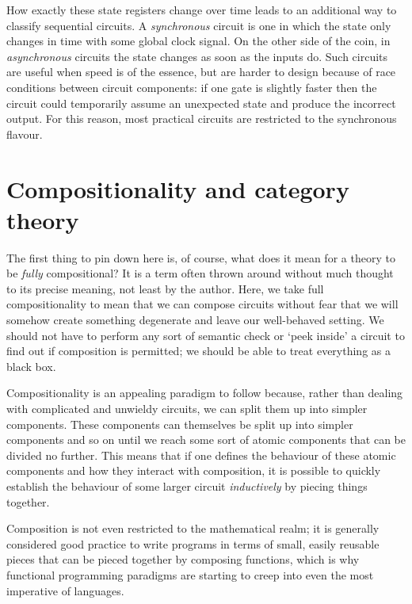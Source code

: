 How exactly these state registers change over time leads to an additional way
to classify sequential circuits.
A \emph{synchronous} circuit is one in which the state only changes in time with
some global clock signal.
On the other side of the coin, in \emph{asynchronous} circuits the state changes
as soon as the inputs do.
Such circuits are useful when speed is of the essence, but are harder to design
because of race conditions between circuit components: if one gate is slightly
faster then the circuit could temporarily assume an unexpected state and produce
the incorrect output.
For this reason, most practical circuits are restricted to the synchronous
flavour.

\section{Compositionality and category theory}


The first thing to pin down here is, of course, what does it mean for a theory
to be \emph{fully} compositional?
It is a term often thrown around without much thought to its precise meaning,
not least by the author.
Here, we take full compositionality to mean that we can compose circuits
without fear that we will somehow create something degenerate and leave our
well-behaved setting.
We should not have to perform any sort of semantic check or `peek inside' a
circuit to find out if composition is permitted; we should be able to treat
everything as a black box.

Compositionality is an appealing paradigm to follow because, rather than dealing
with complicated and unwieldy circuits, we can split them up into simpler
components.
These components can themselves be split up into simpler components and so on
until we reach some sort of atomic components that can be divided no further.
This means that if one defines the behaviour of these atomic components and
how they interact with composition, it is possible to quickly establish the
behaviour of some larger circuit \emph{inductively} by piecing things together.

Composition is not even restricted to the mathematical realm; it is generally
considered good practice to write programs in terms of small, easily reusable
pieces that can be pieced together by composing functions, which is why
functional programming paradigms are starting to creep into even the most
imperative of languages.

